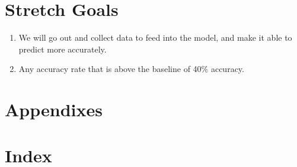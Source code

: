 \documentclass[10pt, draftclsnofoot, onecolumn]{IEEEtran}
\begin{document}
\section{Stretch Goals}
	\begin{enumerate}
		\item We will go out and collect data to feed into the model, and make it able to predict more accurately.
		\item Any accuracy rate that is above the baseline of 40\% accuracy.
	\end{enumerate}
\section*{Appendixes}
\section*{Index}
\end{document}
